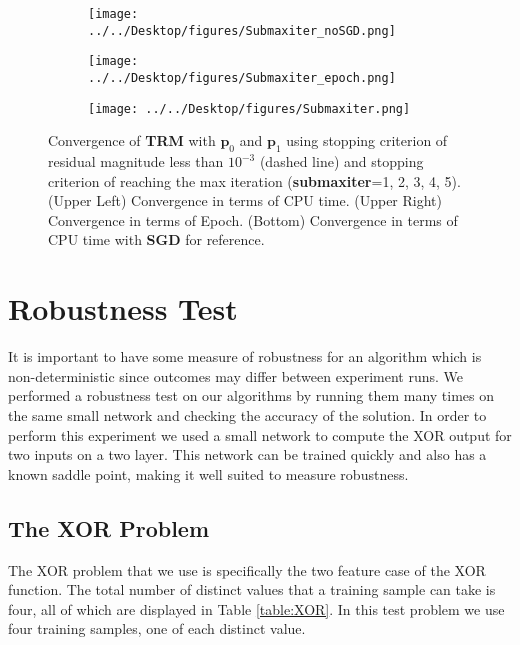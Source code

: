 \documentclass[letterpaper,12pt,titlepage,oneside,final]{book}
\begin{document}
	
	\begin{figure}
		\centering
		\begin{subfigure}{.49\textwidth}
			\texttt{[image: ../../Desktop/figures/Submaxiter\_noSGD.png]}
		\end{subfigure}
		\begin{subfigure}{.49\textwidth}
			\texttt{[image: ../../Desktop/figures/Submaxiter\_epoch.png]}
		\end{subfigure}
		\begin{subfigure}{.5\textwidth}
			\texttt{[image: ../../Desktop/figures/Submaxiter.png]}
		\end{subfigure}
		\caption{Convergence of \textbf{TRM} with $\mathbf{p}_{0}$ and $\mathbf{p}_{1}$ using stopping criterion of residual magnitude less than $10^{-3}$ (dashed line) and stopping criterion of reaching the max iteration (\textbf{submaxiter}=1, 2, 3, 4, 5). (Upper Left) Convergence in terms of CPU time. (Upper Right) Convergence in terms of Epoch. (Bottom) Convergence in terms of CPU time with \textbf{SGD} for reference.}
		\label{figure:mnist_maxiter}
	\end{figure}
	
	\section{Robustness Test} 
	
	It is important to have some measure of robustness for an algorithm which is non-deterministic since outcomes may differ between experiment runs. We performed a robustness test on our algorithms by running them many times on the same small network and checking the accuracy of the solution. In order to perform this experiment we used a small network to compute the XOR output for two inputs on a two layer. This network can be trained quickly and also has a known saddle point, making it well suited to measure robustness.
	
	\subsection{The XOR Problem}
	
	The XOR problem that we use is specifically the two feature case of the XOR function. The total number of distinct values that a training sample can take is four, all of which are displayed in Table \ref{table:XOR}. In this test problem we use four training samples, one of each distinct value.
	
\end{document}
